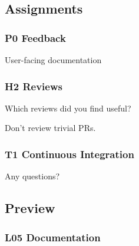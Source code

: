 
%
%

\breakframe





\subsection{Assignments}

\begin{assignment}
	\frametitle{P0 Feedback}

	\begin{task}
	User-facing documentation
	\end{task}
\end{assignment}

\begin{assignment}
	\frametitle{H2 Reviews}

	\begin{task}
	Which reviews did you find useful?
	\end{task}

	\begin{task}
	Don't review trivial PRs.
	\end{task}
\end{assignment}

\begin{assignment}
	\frametitle{T1 Continuous Integration}

	\begin{task}
	Any questions?
	\end{task}
\end{assignment}

%

\subsection{Preview}

\begin{frame}
	\frametitle{L05 Documentation}
\end{frame}



